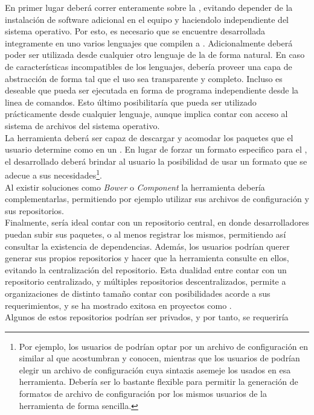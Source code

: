 En primer lugar deberá correr enteramente sobre la \jvm, evitando depender de 
la instalación de software adicional en el equipo y haciendolo independiente 
del sistema operativo. Por esto, es necesario que se encuentre desarrollada 
integramente en uno varios lenguajes que compilen a \bytecode \java.  
Adicionalmente deberá poder ser utilizada desde cualquier otro lenguaje de la 
\jvm de forma natural. En caso de características incompatibles de los 
lenguajes, debería proveer una capa de abstracción de forma tal que el uso sea 
transparente y completo. Incluso es deseable que pueda ser ejecutada en forma 
de programa independiente desde la linea de comandos. Esto último posibilitaría 
que pueda ser utilizado prácticamente desde cualquier lenguaje, aunque implica 
contar con acceso al sistema de archivos del sistema operativo.\\
La herramienta deberá ser capaz de descargar y acomodar los paquetes que el 
usuario determine como \dependencies en un \conffile. En lugar de forzar un 
formato especifico para el \conffile, el \depmgr desarrollado deberá brindar al 
usuario la posibilidad de usar un formato que se adecue a sus 
necesidades\footnote{
	Por ejemplo, los usuarios de \apache \maven podrían optar por un archivo de 
	configuración en \xml similar al que acostumbran y conocen, mientras que 
	los usuarios de \sbt podrían elegir un archivo de configuración cuya 
	sintaxis asemeje los usados en esa herramienta. Debería ser lo bastante 
	flexible para permitir la generación de formatos de archivo de 
	configuración por los mismos usuarios de la herramienta de forma sencilla.
}.\\
Al existir soluciones como \emph{Bower} o \emph{Component} la herramienta 
debería complementarlas, permitiendo por ejemplo utilizar sus archivos de 
configuración y sus repositorios.\\
Finalmente, sería ideal contar con un repositorio central, en donde 
desarrolladores puedan subir sus paquetes, o al menos registrar los mismos, 
permitiendo así consultar la existencia de dependencias. Además, los usuarios 
podrían querer generar sus propios repositorios y hacer que la herramienta 
consulte en ellos, evitando la centralización del repositorio. Esta dualidad 
entre contar con un repositorio centralizado, y múltiples repositorios 
descentralizados, permite a organizaciones de distinto tamaño contar con 
posibilidades acorde a sus requerimientos, y se ha mostrado exitosa en 
proyectos como \maven.\\
Algunos de estos repositorios podrían ser privados, y por tanto, se requeriría 
